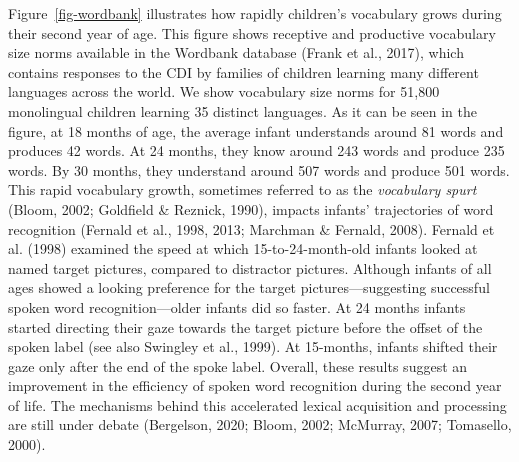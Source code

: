 \documentclass[
  12pt,
  b5paperpaper,
  twoside]{scrreprt}
\begin{document}
Figure~\ref{fig-wordbank} illustrates how rapidly children's vocabulary
grows during their second year of age. This figure shows receptive and
productive vocabulary size norms available in the Wordbank database
(Frank et al., 2017), which contains responses to the CDI by families of
children learning many different languages across the world. We show
vocabulary size norms for 51,800 monolingual children learning 35
distinct languages. As it can be seen in the figure, at 18 months of
age, the average infant understands around 81 words and produces 42
words. At 24 months, they know around 243 words and produce 235 words.
By 30 months, they understand around 507 words and produce 501 words.
This rapid vocabulary growth, sometimes referred to as the
\emph{vocabulary spurt} (Bloom, 2002; Goldfield \& Reznick, 1990),
impacts infants' trajectories of word recognition (Fernald et al., 1998,
2013; Marchman \& Fernald, 2008). Fernald et al. (1998) examined the
speed at which 15-to-24-month-old infants looked at named target
pictures, compared to distractor pictures. Although infants of all ages
showed a looking preference for the target pictures---suggesting
successful spoken word recognition---older infants did so faster. At 24
months infants started directing their gaze towards the target picture
before the offset of the spoken label (see also Swingley et al., 1999).
At 15-months, infants shifted their gaze only after the end of the spoke
label. Overall, these results suggest an improvement in the efficiency
of spoken word recognition during the second year of life. The
mechanisms behind this accelerated lexical acquisition and processing
are still under debate (Bergelson, 2020; Bloom, 2002; McMurray, 2007;
Tomasello, 2000).
\end{document}
